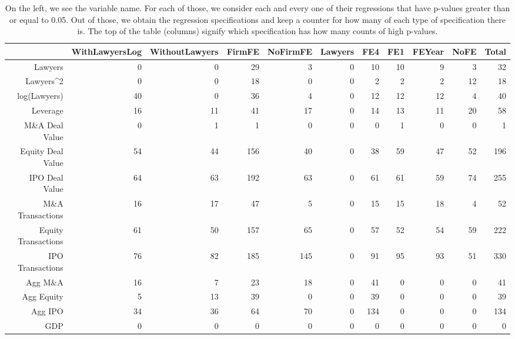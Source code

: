 \documentclass{article}
\begin{document}
\begin{table}[H]
\centering
\begin{tabular}{rrrrrrrrrrr}
  \hline
 & WithLawyersLog & WithoutLawyers & FirmFE & NoFirmFE & Lawyers & FE4 & FE1 & FEYear & NoFE & \textbf{Total} \\ 
  \hline
Lawyers & 0 & 0 & 29 & 3 & 0 & 10 & 10 & 9 & 3 & 32 \\ 
  Lawyers^2 & 0 & 0 & 18 & 0 & 0 & 2 & 2 & 2 & 12 & 18 \\ 
  log(Lawyers) & 40 & 0 & 36 & 4 & 0 & 12 & 12 & 12 & 4 & 40 \\ 
  Leverage & 16 & 11 & 41 & 17 & 0 & 14 & 13 & 11 & 20 & 58 \\ 
  M\&A Deal Value & 0 & 1 & 1 & 0 & 0 & 0 & 1 & 0 & 0 & 1 \\ 
  Equity Deal Value & 54 & 44 & 156 & 40 & 0 & 38 & 59 & 47 & 52 & 196 \\ 
  IPO Deal Value & 64 & 63 & 192 & 63 & 0 & 61 & 61 & 59 & 74 & 255 \\ 
  M\&A Transactions & 16 & 17 & 47 & 5 & 0 & 15 & 15 & 18 & 4 & 52 \\ 
  Equity Transactions & 61 & 50 & 157 & 65 & 0 & 57 & 52 & 54 & 59 & 222 \\ 
  IPO Transactions & 76 & 82 & 185 & 145 & 0 & 91 & 95 & 93 & 51 & 330 \\ 
  Agg M\&A & 16 & 7 & 23 & 18 & 0 & 41 & 0 & 0 & 0 & 41 \\ 
  Agg Equity & 5 & 13 & 39 & 0 & 0 & 39 & 0 & 0 & 0 & 39 \\ 
  Agg IPO & 34 & 36 & 64 & 70 & 0 & 134 & 0 & 0 & 0 & 134 \\ 
  GDP & 0 & 0 & 0 & 0 & 0 & 0 & 0 & 0 & 0 & 0 \\ 
   \hline
\end{tabular}
\caption{On the left, we see the variable name. For each of those, we consider each and every one of their regressions
  that have p-values greater than or equal to 0.05. Out of those, we obtain the regression specifications and keep a counter
  for how many of each type of specification there is. The top of the table (columns) signify which specification has how many counts of high p-values.} 
\end{table}
\end{document}
